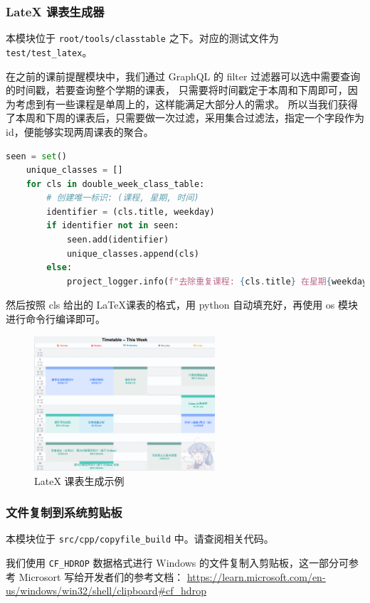 \subsubsection{LateX 课表生成器}

本模块位于 \texttt{root/tools/classtable} 之下。对应的测试文件为 \texttt{test/test\_latex}。

在之前的课前提醒模块中，我们通过 GraphQL 的 filter 过滤器可以选中需要查询的时间戳，若要查询整个学期的课表，
只需要将时间戳定于本周和下周即可，因为考虑到有一些课程是单周上的，这样能满足大部分人的需求。
所以当我们获得了本周和下周的课表后，只需要做一次过滤，采用集合过滤法，指定一个字段作为 id，便能够实现两周课表的聚合。

\begin{lstlisting}[language = python]
    seen = set()
    unique_classes = []
    for cls in double_week_class_table:
        # 创建唯一标识: (课程, 星期, 时间)
        identifier = (cls.title, weekday)
        if identifier not in seen:
            seen.add(identifier)
            unique_classes.append(cls)
        else:
            project_logger.info(f"去除重复课程: {cls.title} 在星期{weekday + 1} {class_time}")
\end{lstlisting}

然后按照 cls 给出的 \LaTeX 课表的格式，用 python 自动填充好，再使用 os 模块进行命令行编译即可。

\begin{figure}[H]
    \centering
    \includegraphics[width=0.6\textwidth]{img/classtable_example.png}
    \caption{LateX 课表生成示例}
    \label{fig:latex_table}
\end{figure}

\subsubsection{文件复制到系统剪贴板}

\begin{note}
    本模块位于 \texttt{src/cpp/copyfile\_build} 中。请查阅相关代码。

    我们使用 \texttt{CF\_HDROP} 数据格式进行 Windows 的文件复制入剪贴板，这一部分可参考 Microsort 写给开发者们的参考文档：
    \href{https://learn.microsoft.com/en-us/windows/win32/shell/clipboard#cf_hdrop}{\underline{https://learn.microsoft.com/en-us/windows/win32/shell/clipboard\#cf\_hdrop}}
\end{note}

